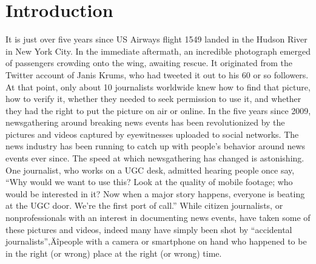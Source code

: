 \documentclass[symmetric, notoc, nobib]{towcenter-book}
\begin{document}
\chapter{Introduction}
It is just over five years since US Airways flight 1549 landed in the Hudson
River in New York City. In the immediate aftermath, an incredible photograph
emerged of passengers crowding onto the wing, awaiting rescue. It
originated from the Twitter account of Janis Krums, who had tweeted it out
to his 60 or so followers. At that point, only about 10 journalists worldwide
knew how to find that picture, how to verify it, whether they needed to seek
permission to use it, and whether they had the right to put the picture on
air or online. In the five years since 2009, newsgathering around breaking
news events has been revolutionized by the pictures and videos captured
by eyewitnesses uploaded to social networks. The news industry has been
running to catch up with people's behavior around news events ever since.
The speed at which newsgathering has changed is astonishing. One journalist,
who works on a UGC desk, admitted hearing people once say, ``Why
would we want to use this? Look at the quality of mobile footage; who would
be interested in it? Now when a major story happens, everyone is beating at
the UGC door. We're the first port of call.''
While citizen journalists, or nonprofessionals with an interest in documenting news events, have taken some of these pictures and videos, indeed many have simply been shot by ``accidental journalists''‚Äîpeople with a camera or smartphone on hand who happened to be in the right (or wrong) place at the right (or wrong) time.
\end{document}
